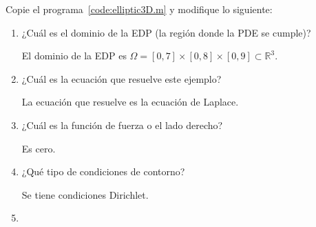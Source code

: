 \begin{problem}
Copie el programa~\ref{code:elliptic3D.m} y modifique lo siguiente:

\begin{enumerate}
      \item

            ¿Cuál es el dominio de la EDP (la región donde la PDE se
            cumple)?

            \begin{solution}
                  El dominio de la EDP es
                  \begin{math}
                        \Omega=
                        \left[
                              0,7
                              \right]\times
                        \left[
                              0,8
                              \right]\times
                        \left[
                              0,9
                              \right]\subset\mathbb{R}^{3}
                  \end{math}.
                  \noQED
            \end{solution}

      \item

            ¿Cuál es la ecuación que resuelve este ejemplo?

            \begin{solution}
                  La ecuación que resuelve es la ecuación de Laplace.
                  \noQED
            \end{solution}

      \item

            ¿Cuál es la función de fuerza o el lado derecho?

            \begin{solution}
                  Es cero.
                  \noQED
            \end{solution}

      \item

            ¿Qué tipo de condiciones de contorno?

            \begin{solution}
                  Se tiene condiciones Dirichlet.
                  \noQED
            \end{solution}

      \item


\end{enumerate}
\end{problem}
